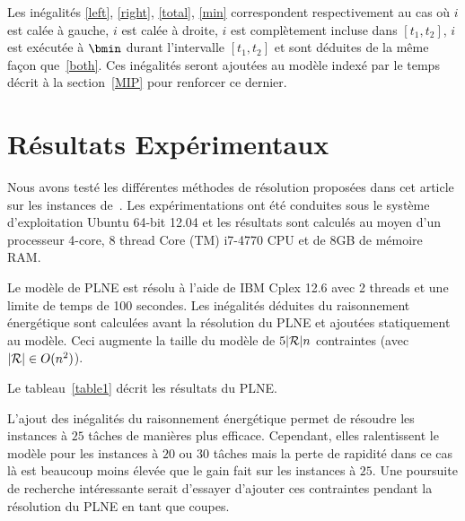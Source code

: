 Les inégalités \eqref{left}, \eqref{right}, \eqref{total}, \eqref{min}
correspondent respectivement au cas où $i$ est calée à gauche, $i$ est
calée à droite, $i$ est complètement incluse dans $[t_1,t_2]$, $i$ est
exécutée à $\bmin$ durant l'intervalle $[t_1,t_2]$ et sont déduites de
la même façon que~\eqref{both}.  Ces inégalités seront ajoutées au
modèle indexé par le temps décrit à la section~\ref{MIP} pour
renforcer ce dernier. 
 
\section{Résultats Expérimentaux}

Nous avons testé les différentes méthodes de résolution proposées dans
cet article sur les instances de~\cite{Nattaf2015}. Les
expérimentations ont été conduites sous le système d'exploitation
Ubuntu 64-bit 12.04 et les résultats sont calculés au moyen d'un
processeur 4-core, 8 thread Core (TM) i7-4770 CPU et de 8GB de mémoire
RAM. 

Le modèle de PLNE est résolu à l'aide de IBM Cplex 12.6 avec 2 threads
et une limite de temps de 100 secondes. Les inégalités déduites du
raisonnement énergétique sont calculées avant la résolution du PLNE et
ajoutées statiquement au modèle. Ceci augmente la taille du modèle de
$5|{\cal R}|n$ contraintes (avec $|{\cal R}| \in O(n^2)$). 

Le tableau~\ref{table1} décrit les résultats du PLNE. 

L'ajout des inégalités du raisonnement énergétique permet de résoudre
les instances à $25$ tâches de manières plus efficace. Cependant, elles
ralentissent le modèle pour les instances à $20$ ou $30$ tâches mais
la perte de rapidité dans ce cas là est beaucoup moins élevée que le
gain fait sur les instances à $25$. Une poursuite de recherche
intéressante serait d'essayer d'ajouter ces contraintes pendant la
résolution du PLNE en tant que coupes. 

